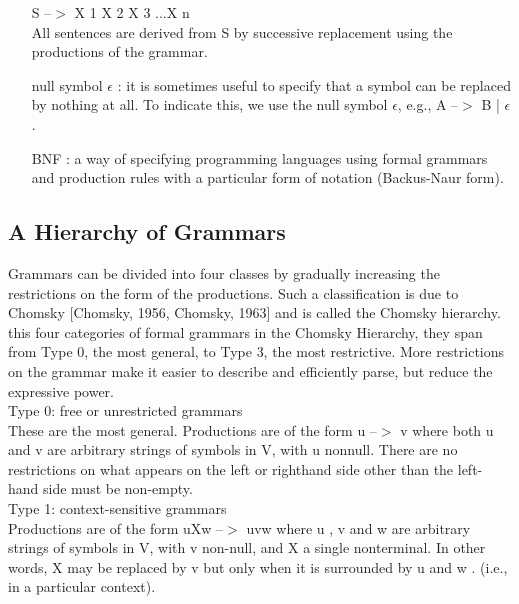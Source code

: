 \begin{enumerate}
S –$>$ X 1 X 2 X 3 ...X n\\

All sentences are derived from S by successive replacement using the productions of the grammar.\\

\item [null symbol $\epsilon$ :] it is sometimes useful to specify that a symbol can be replaced by nothing at all. To indicate this, we use the null symbol $\epsilon$, e.g., A –$>$ B | $\epsilon$.\\

\item [BNF :] a way of specifying programming languages using formal grammars and production rules with a particular form of notation (Backus-Naur form).\\

\end{enumerate}



\subsection{A Hierarchy of Grammars}

Grammars can be divided into four classes by gradually increasing the restrictions on the form of
the productions. Such a classification is due to Chomsky [Chomsky, 1956, Chomsky, 1963] and is called the Chomsky hierarchy.
\\
this four categories of formal grammars in the Chomsky Hierarchy, they span from Type 0, the most general, to Type 3, the most restrictive. More restrictions on the grammar make it easier to describe and efficiently parse, but reduce the expressive power.\\


Type 0: free or unrestricted grammars\\
These are the most general. Productions are of the form u –$>$ v where both u and v are arbitrary strings of symbols in V, with u nonnull. There are no restrictions on what appears on the left or righthand side other than the left-hand side must be non-empty.\\


Type 1: context-sensitive grammars\\
Productions are of the form uXw –$>$ uvw where u , v and w are arbitrary strings of symbols in V, with v non-null, and X a single nonterminal. In other words, X may be replaced by v but only when it is surrounded by u and w . (i.e., in a particular context).\\

